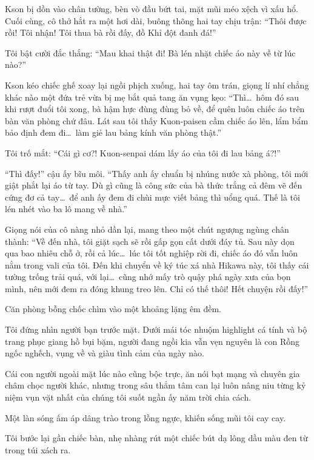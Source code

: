 \documentclass[../main.tex]{subfiles}
\begin{document}
Kson bị dồn vào chân tường, bèn vò đầu bứt tai, mặt mũi méo xệch vì xấu hổ. Cuối cùng, cô thở hắt ra một hơi dài, buông thõng hai tay chịu trận: ``Thôi được rồi! Tôi nhận! Tôi thua bà rồi đấy, đồ Khỉ đột đanh đá!''

Tôi bật cười đắc thắng: ``Mau khai thật đi! Bà lén nhặt chiếc áo này về từ lúc nào?''

Kson kéo chiếc ghế xoay lại ngồi phịch xuống, hai tay ôm trán, giọng lí nhí chẳng khác nào một đứa trẻ vừa bị mẹ bắt quả tang ăn vụng kẹo: ``Thì\dots\ hôm đó sau khi rượt đuổi tôi xong, bà hậm hực đùng đùng bỏ về, để quên luôn chiếc áo trên bàn văn phòng chứ đâu. Lát sau tôi thấy Kuon-paisen cầm chiếc áo lên, lẩm bẩm bảo định đem đi\dots\ làm giẻ lau bảng kính văn phòng thật.''

Tôi trố mắt: ``Cái gì cơ?! Kuon-senpai dám lấy áo của tôi đi lau bảng á?!''

``Thì đấy!'' cậu ấy bĩu môi. ``Thấy anh ấy chuẩn bị nhúng nước xà phòng, tôi mới giật phắt lại áo từ tay. Dù gì cũng là công sức của bà thức trắng cả đêm vẽ đến cứng đơ cả tay\dots\ để anh ấy đem đi chùi mực viết bảng thì uổng quá. Thế là tôi lén nhét vào ba lô mang về nhà.''

Giọng nói của cô nàng nhỏ dần lại, mang theo một chút ngượng ngùng chân thành: ``Về đến nhà, tôi giặt sạch sẽ rồi gấp gọn cất dưới đáy tủ. Sau này dọn qua bao nhiêu chỗ ở, rồi cả lúc\dots\ lúc tôi tốt nghiệp rời đi, chiếc áo đó vẫn luôn nằm trong vali của tôi. Đến khi chuyển về ký túc xá nhà Hikawa này, tôi thấy cái tường trống trải quá, với lại\dots\ cũng nhớ mấy trò quậy phá ngày xưa của bọn mình, nên mới đem ra đóng khung treo lên. Chỉ có thế thôi! Hết chuyện rồi đấy!''

Căn phòng bỗng chốc chìm vào một khoảng lặng êm đềm.

Tôi đứng nhìn người bạn trước mặt. Dưới mái tóc nhuộm highlight cá tính và bộ trang phục giang hồ bụi bặm, người đang ngồi kia vẫn vẹn nguyên là con Rồng ngốc nghếch, vụng về và giàu tình cảm của ngày nào.

Cái con người ngoài mặt lúc nào cũng bộc trực, ăn nói bạt mạng và chuyên gia châm chọc người khác, nhưng trong sâu thẳm tâm can lại luôn nâng niu từng kỷ niệm vụn vặt nhất của chúng tôi suốt ngần ấy năm trời chia cách.

Một làn sóng ấm áp dâng trào trong lồng ngực, khiến sống mũi tôi cay cay.

Tôi bước lại gần chiếc bàn, nhẹ nhàng rút một chiếc bút dạ lông dầu màu đen từ trong túi xách ra.
\end{document}
